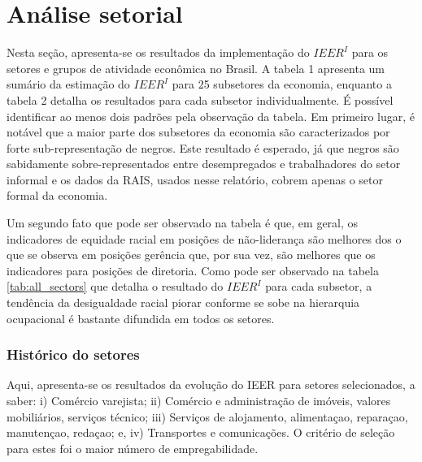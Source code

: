 \documentclass[12pt]{article}
\begin{document}
\section{Análise setorial} \label{sectors}

\par Nesta seção, apresenta-se os resultados da implementação do $IEER^{I}$ para os setores e grupos de atividade econômica no Brasil. A tabela 1 apresenta um sumário da estimação do $IEER^{I}$ para 25 subsetores da economia, enquanto a tabela 2 detalha os resultados para cada subsetor individualmente. É possível identificar ao menos dois padrões pela observação da tabela. Em primeiro lugar, é notável que a maior parte dos subsetores da economia são caracterizados por forte sub-representação de negros. Este resultado é esperado, já que negros são sabidamente sobre-representados entre desempregados e trabalhadores do setor informal e os dados da RAIS, usados nesse relatório, cobrem apenas o setor formal da economia.


 \label{tab_summary_sector}

\par Um segundo fato que pode ser observado na tabela é que, em geral, os indicadores de equidade racial em posições de não-liderança são melhores dos o que se observa em posições gerência que, por sua vez, são melhores que os indicadores para posições de diretoria. Como pode ser observado na tabela \ref{tab:all_sectors} que detalha o resultado do $IEER^{I}$ para cada subsetor, a tendência da desigualdade racial piorar conforme se sobe na hierarquia ocupacional é bastante difundida em todos os setores.


\clearpage


\clearpage
\subsubsection{Histórico do setores}
\par Aqui, apresenta-se os resultados da evolução do IEER para setores selecionados, a saber: i) Comércio varejista; ii) Comércio e administração de imóveis, valores mobiliários, serviços técnico; iii) Serviços de alojamento, alimentaçao, reparaçao, manutençao, redaçao; e, iv)  Transportes e comunicações. O critério de seleção para estes foi o maior número de empregabilidade.
\end{document}
